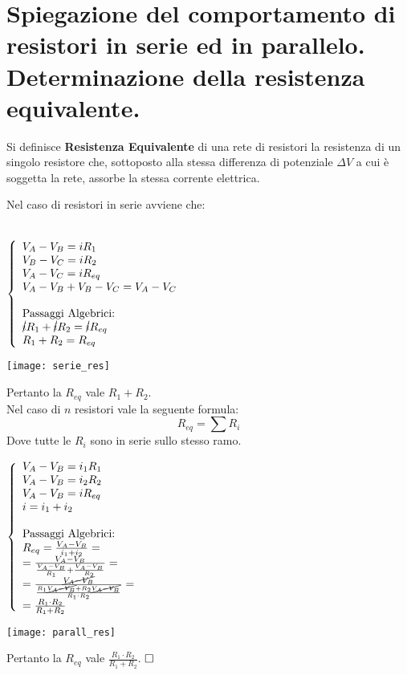 \section{Spiegazione del comportamento di resistori in serie ed in
	parallelo. Determinazione della resistenza equivalente.}

Si definisce \textbf{Resistenza Equivalente} di una rete di resistori la resistenza di un singolo resistore che, sottoposto alla stessa differenza di potenziale $\Delta V$ a cui \`e soggetta la rete, assorbe la stessa corrente elettrica.

Nel caso di resistori in serie avviene che:\\
\\
\noindent\begin{minipage}{0.3\textwidth}
$
\left\{
\begin{array}{lr}
	V_A - V_B = i R_1 \\	
	V_B - V_C = i R_2	\\	
	V_A - V_C = i R_{eq} \\
	V_A - V_B + V_B - V_C = V_A - V_C \\
	\\
	\textnormal{Passaggi Algebrici:}\\
	\cancel{i} R_1 + \cancel{i} R_2 = \cancel{i} R_{eq} \\
	R_1 + R_2 = R_{eq}
\end{array}
\right.
$
\end{minipage}
\hfill%
\begin{minipage}{0.6\textwidth}\raggedleft
	\texttt{[image: serie\_res]}
\end{minipage}
Pertanto la $R_{eq}$ vale $R_1 + R_2$.\\
Nel caso di $n$ resistori vale la seguente formula:
\begin{equation}
    R_{eq} = \sum{R_i}
\end{equation}
Dove tutte le $R_i$ sono in serie sullo stesso ramo.\\
\noindent\begin{minipage}{0.3\textwidth}
	$
	\left\{
	\begin{array}{lr}
	V_A - V_B = i_1 R_1 \\	
	V_A - V_B = i_2 R_2	\\	
	V_A - V_B = i R_{eq} \\
	i = i_1 + i_2 \\
	\\
	\textnormal{Passaggi Algebrici:}\\
	R_{eq} = \frac{V_A - V_B}{i_1 + i_2} =\\
	= \frac{V_A - V_B}{\frac{V_A - V_B}{R_1} + \frac{V_A - V_B}{R_2}} =\\
	= \frac{\cancel{V_A - V_B}}{\frac{R_1\cancel{V_A - V_B} + R_2\cancel{V_A - V_B}}{R_1 \cdot R_2}} =\\
	= \frac{R_1 \cdot R_2}{R_1 + R_2}
	\end{array}
	\right.
	$
\end{minipage}
\hfill%
\begin{minipage}{0.6\textwidth}\raggedleft
	\texttt{[image: parall\_res]}
\end{minipage}
Pertanto la $R_{eq}$ vale $\frac{R_1 \cdot R_2}{R_1 + R_2}$.
$\hfill\square$
